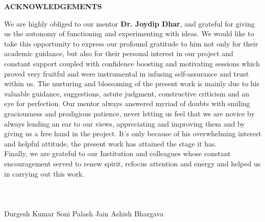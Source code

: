 \newpage
\quad
\newpage
\baselineskip=21pt
\thispagestyle{empty}
\begin{center}
{\large \bf ACKNOWLEDGEMENTS}
\end{center}
 We are highly obliged to our mentor {\bf Dr. Joydip Dhar}, and grateful for giving us the autonomy of functioning and experimenting with ideas. We would like to take this opportunity to express our profound gratitude to him not only for their academic guidance, but also for their personal interest in our project and constant support coupled with confidence boosting and motivating sessions which proved very fruitful and were instrumental in infusing self-assurance and trust within us. The nurturing and blossoming of the present work is mainly due to his valuable guidance, suggestions, astute judgment, constructive criticism and an eye for perfection. Our mentor always answered myriad of doubts with smiling graciousness and prodigious patience, never letting us feel that we are novice by always lending an ear to our views, appreciating and improving them and by giving us a free hand in the project. It's only because of his overwhelming interest and helpful attitude, the present work has attained the stage it has.\\
\noindent Finally, we are grateful to our Institution and colleagues whose constant encouragement served to renew spirit, refocus attention and energy and helped us in carrying out this work.\\ \\ \\ \\
Durgesh Kumar Soni \hspace{1.2in} Palash Jain  \hspace{1.2in} Ashish Bhargava




